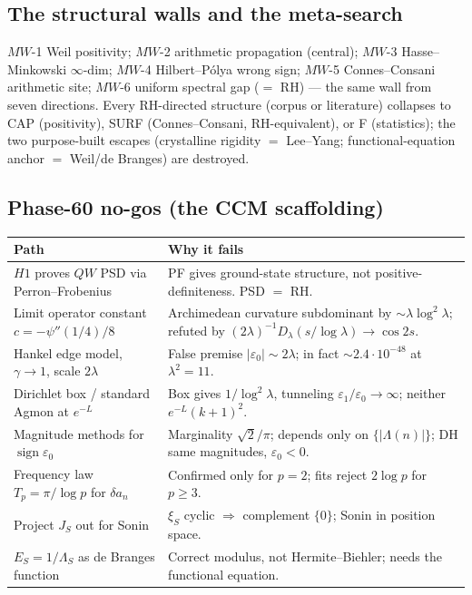 \documentclass[11pt]{amsart}
\theoremstyle{definition}
\theoremstyle{remark}
\newcommand{\ve}{\varepsilon}
\begin{document}
\subsection{The structural walls and the meta-search}
$MW$-1 Weil positivity; $MW$-2 arithmetic propagation (central); $MW$-3 Hasse--Minkowski
$\infty$-dim; $MW$-4 Hilbert--P\'olya wrong sign; $MW$-5 Connes--Consani arithmetic site; $MW$-6
uniform spectral gap ($=$ RH) --- the same wall from seven directions. Every RH-directed
structure (corpus or literature) collapses to CAP (positivity), SURF (Connes--Consani,
RH-equivalent), or F (statistics); the two purpose-built escapes (crystalline rigidity $=$
Lee--Yang; functional-equation anchor $=$ Weil/de Branges) are destroyed.

\subsection{Phase-60 no-gos (the CCM scaffolding)}
\begin{longtable}{p{6.3cm} p{8cm}}
\toprule \textbf{Path} & \textbf{Why it fails} \\ \midrule \endhead
$H1$ proves $QW$ PSD via Perron--Frobenius & PF gives ground-state structure, not positive-definiteness. PSD $=$ RH. \\
Limit operator constant $c=-\psi''(1/4)/8$ & Archimedean curvature subdominant by $\sim\lambda\log^2\lambda$; refuted by $(2\lambda)^{-1}D_\lambda(s/\log\lambda)\to\cos2s$. \\
Hankel edge model, $\gamma\to1$, scale $2\lambda$ & False premise $|\ve_0|\sim2\lambda$; in fact $\sim2.4\cdot10^{-48}$ at $\lambda^2{=}11$. \\
Dirichlet box / standard Agmon at $e^{-L}$ & Box gives $1/\log^2\lambda$, tunneling $\ve_1/\ve_0\to\infty$; neither $e^{-L}(k{+}1)^2$. \\
Magnitude methods for $\operatorname{sign}\ve_0$ & Marginality $\sqrt2/\pi$; depends only on $\{|\Lambda(n)|\}$; DH same magnitudes, $\ve_0<0$. \\
Frequency law $T_p=\pi/\log p$ for $\delta a_n$ & Confirmed only for $p=2$; fits reject $2\log p$ for $p\ge3$. \\
Project $J_S$ out for Sonin & $\xi_S$ cyclic $\Rightarrow$ complement $\{0\}$; Sonin in position space. \\
$E_S=1/\Lambda_S$ as de Branges function & Correct modulus, not Hermite--Biehler; needs the functional equation. \\
\bottomrule
\end{longtable}
\end{document}

